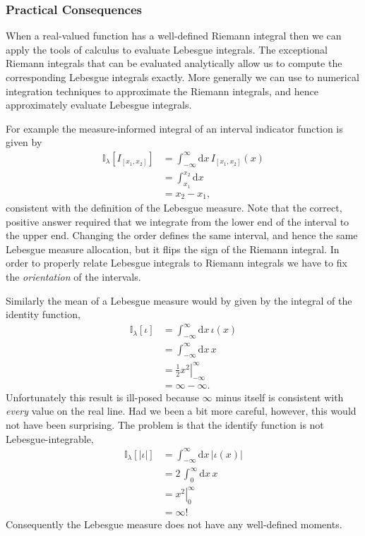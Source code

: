 \documentclass[
  letterpaper,
  DIV=11,
  numbers=noendperiod]{scrartcl}
\begin{document}
\hypertarget{sec:practical_lebesgue}{%
\subsubsection{Practical Consequences}\label{sec:practical_lebesgue}}

When a real-valued function has a well-defined Riemann integral then we
can apply the tools of calculus to evaluate Lebesgue integrals. The
exceptional Riemann integrals that can be evaluated analytically allow
us to compute the corresponding Lebesgue integrals exactly. More
generally we can use to numerical integration techniques to approximate
the Riemann integrals, and hence approximately evaluate Lebesgue
integrals.

For example the measure-informed integral of an interval indicator
function is given by \begin{align*}
\mathbb{I}_{\lambda}[I_{[x_{1}, x_{2}]}]
&=
\int_{-\infty}^{\infty} \mathrm{d} x \, I_{[x_{1}, x_{2}]}(x)
\\
&=
\int_{x_{1}}^{x_{2}} \mathrm{d} x
\\
&=
x_{2} - x_{1},
\end{align*} consistent with the definition of the Lebesgue measure.
Note that the correct, positive answer required that we integrate from
the lower end of the interval to the upper end. Changing the order
defines the same interval, and hence the same Lebesgue measure
allocation, but it flips the sign of the Riemann integral. In order to
properly relate Lebesgue integrals to Riemann integrals we have to fix
the \emph{orientation} of the intervals.

Similarly the mean of a Lebesgue measure would by given by the integral
of the identity function, \begin{align*}
\mathbb{I}_{\lambda}[\iota]
&=
\int_{-\infty}^{\infty} \mathrm{d} x \, \iota(x)
\\
&=
\int_{-\infty}^{\infty} \mathrm{d} x \, x
\\
&=
\left. \frac{1}{2} x^{2} \right|^{\infty}_{-\infty}
\\
&=
\infty - \infty.
\end{align*} Unfortunately this result is ill-posed because \(\infty\)
minus itself is consistent with \emph{every} value on the real line. Had
we been a bit more careful, however, this would not have been
surprising. The problem is that the identify function is not
Lebesgue-integrable, \begin{align*}
\mathbb{I}_{\lambda}[| \iota |]
&=
\int_{-\infty}^{\infty} \mathrm{d} x \, | \iota(x) |
\\
&=
2 \, \int_{0}^{\infty} \mathrm{d} x \, x
\\
&=
\left. x^{2} \right|^{\infty}_{0}
\\
&=
\infty!
\end{align*} Consequently the Lebesgue measure does not have any
well-defined moments.
\end{document}
